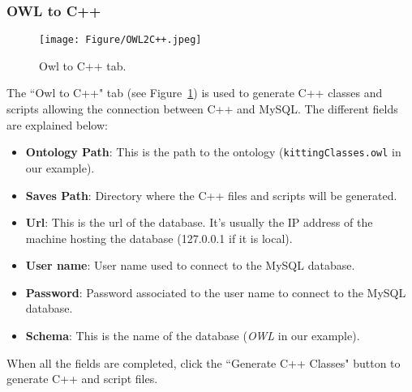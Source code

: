 \subsubsection{OWL to C++}
\begin{figure}[h!t!]
\centering
\texttt{[image: Figure/OWL2C++.jpeg]}
\caption{Owl to C++ tab.}
\label{fig:owl2C++}
\end{figure}
The ``Owl to C++" tab (see Figure~\ref{fig:owl2C++}) is used to generate C++ classes and scripts allowing the connection between C++ and MySQL. The different fields are explained below:
\begin{itemize}
\item \textbf{Ontology Path}: This is the path to the ontology (\texttt{kittingClasses.owl} in our example).
\item \textbf{Saves Path}: Directory where the C++ files and scripts will be generated.
\item \textbf{Url}: This is the url of the database. It's usually the IP address of the machine hosting the database (127.0.0.1 if it is local).
\item \textbf{User name}: User name used to connect to the MySQL database.
\item \textbf{Password}: Password associated to the user name to connect to the MySQL database.
\item \textbf{Schema}: This is the name of the database (\textit{OWL} in our example).
\end{itemize}

When all the fields are completed, click the ``Generate C++ Classes" button to generate C++ and script files.